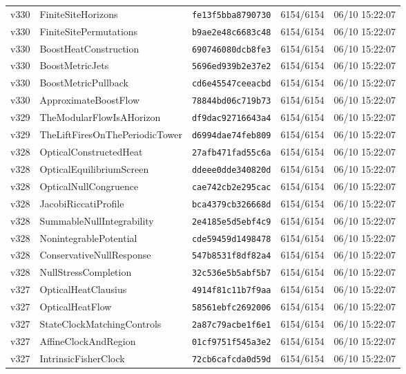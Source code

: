 \documentclass[11pt]{article}
\theoremstyle{definition}\newtheorem{deriv}{Derivation}
\begin{document}
{\begin{longtable}{@{}lllll@{}}
v330 & FiniteSiteHorizons & \texttt{fe13f5bba8790730} & 6154/6154 & 06/10 15:22:07 \\
v330 & FiniteSitePermutations & \texttt{b9ae2e48c6683c48} & 6154/6154 & 06/10 15:22:07 \\
v330 & BoostHeatConstruction & \texttt{690746080dcb8fe3} & 6154/6154 & 06/10 15:22:07 \\
v330 & BoostMetricJets & \texttt{5696ed939b2e37e2} & 6154/6154 & 06/10 15:22:07 \\
v330 & BoostMetricPullback & \texttt{cd6e45547ceeacbd} & 6154/6154 & 06/10 15:22:07 \\
v330 & ApproximateBoostFlow & \texttt{78844bd06c719b73} & 6154/6154 & 06/10 15:22:07 \\
v329 & TheModularFlowIsAHorizon & \texttt{df9dac92716643a4} & 6154/6154 & 06/10 15:22:07 \\
v329 & TheLiftFiresOnThePeriodicTower & \texttt{d6994dae74feb809} & 6154/6154 & 06/10 15:22:07 \\
v328 & OpticalConstructedHeat & \texttt{27afb471fad55c6a} & 6154/6154 & 06/10 15:22:07 \\
v328 & OpticalEquilibriumScreen & \texttt{ddeee0dde340820d} & 6154/6154 & 06/10 15:22:07 \\
v328 & OpticalNullCongruence & \texttt{cae742cb2e295cac} & 6154/6154 & 06/10 15:22:07 \\
v328 & JacobiRiccatiProfile & \texttt{bca4379cb326668d} & 6154/6154 & 06/10 15:22:07 \\
v328 & SummableNullIntegrability & \texttt{2e4185e5d5ebf4c9} & 6154/6154 & 06/10 15:22:07 \\
v328 & NonintegrablePotential & \texttt{cde59459d1498478} & 6154/6154 & 06/10 15:22:07 \\
v328 & ConservativeNullResponse & \texttt{547b8531f8df82a4} & 6154/6154 & 06/10 15:22:07 \\
v328 & NullStressCompletion & \texttt{32c536e5b5abf5b7} & 6154/6154 & 06/10 15:22:07 \\
v327 & OpticalHeatClausius & \texttt{4914f81c11b7f9aa} & 6154/6154 & 06/10 15:22:07 \\
v327 & OpticalHeatFlow & \texttt{58561ebfc2692006} & 6154/6154 & 06/10 15:22:07 \\
v327 & StateClockMatchingControls & \texttt{2a87c79acbe1f6e1} & 6154/6154 & 06/10 15:22:07 \\
v327 & AffineClockAndRegion & \texttt{01cf9751f545a3e2} & 6154/6154 & 06/10 15:22:07 \\
v327 & IntrinsicFisherClock & \texttt{72cb6cafcda0d59d} & 6154/6154 & 06/10 15:22:07 \\

\end{longtable}}
\end{document}
